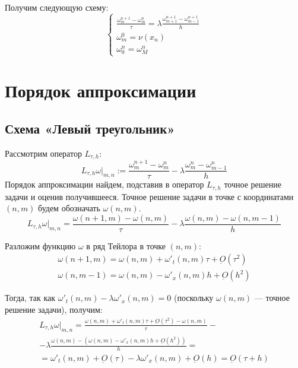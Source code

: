 \documentclass[titlepage]{article}
\begin{document}
Получим следующую схему:
\begin{equation}
 \tag{C}
 \begin{cases}
 	\frac{\omega_m^{n+1} - \omega_m^n}{\tau} = \lambda\frac{\omega_{m+1}^{n+1} - \omega_{m-1}^{n+1}}{h}
 	\\
	\omega_m^0 = \nu(x_n)
	\\	
	\omega_0^n = \omega_M^n
 \end{cases}
\end{equation}

\section{Порядок аппроксимации}
\subsection{Схема «Левый треугольник»}
Рассмотрим оператор $L_{\tau,h}$:
\begin{equation*}
	L_{\tau,h}{\omega} |_{m,n} := \frac{\omega_m^{n+1} - \omega_m^n}{\tau} - \lambda\frac{\omega_m^n - \omega_{m-1}^n}{h}
\end{equation*}
Порядок аппроксимации найдем, подставив в оператор $L_{\tau,h}$ точное решение задачи и оценив получившееся. Точное решение задачи в точке с координатами $(n,m)$ будем обозначать $\omega(n,m)$.
\begin{equation*}
	L_{\tau,h}{\omega} |_{m,n} = \frac{\omega(n+1,m) - \omega(n,m)}{\tau} - \lambda\frac{\omega(n,m) - \omega(n,m-1)}{h}
\end{equation*}

Разложим функцию $\omega$ в ряд Тейлора в точке $(n,m)$:
\begin{gather*}
	\omega(n+1,m) = \omega(n,m) + \omega'_t(n,m)\tau + \underbar{\textit{O}}(\tau^2) \\
	\omega(n,m-1) = \omega(n,m) - \omega'_x(n,m)h + \underbar{\textit{O}}(h^2)
\end{gather*}

Тогда, так как $\omega'_t(n,m) - \lambda\omega'_x(n,m) = 0$ (поскольку $\omega(n,m)$ --- точное решение задачи), получим:
\begin{multline*}
	L_{\tau,h}{\omega} |_{m,n} = \frac{\omega(n,m) + \omega'_t(n,m)\tau + \underbar{\textit{O}}(\tau^2) - \omega(n,m)}{\tau} - \\ 
	 - \lambda\frac{\omega(n,m) - (\omega(n,m) - \omega'_x(n,m)h + \underbar{\textit{O}}(h^2))}{h} = \\
	 = \omega'_t(n,m) + \underbar{\textit{O}}(\tau) - \lambda\omega'_x(n,m) + \underbar{\textit{O}}(h) = \underbar{\textit{O}}(\tau + h)
\end{multline*}
\end{document}
